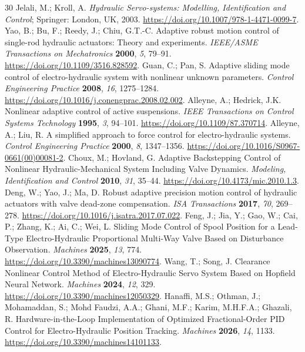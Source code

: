 \documentclass[machines,article,submit,pdftex,moreauthors]{Definitions/mdpi}
\begin{document}
\begin{thebibliography}{30}
 Jelali, M.; Kroll, A. \emph{Hydraulic Servo-systems: Modelling, Identification and Control}; Springer: London, UK, 2003. \url{https://doi.org/10.1007/978-1-4471-0099-7}.
 Yao, B.; Bu, F.; Reedy, J.; Chiu, G.T.-C. Adaptive robust motion control of single-rod hydraulic actuators: Theory and experiments. \emph{IEEE/ASME Transactions on Mechatronics} \textbf{2000}, \emph{5}, 79--91. \url{https://doi.org/10.1109/3516.828592}.
 Guan, C.; Pan, S. Adaptive sliding mode control of electro-hydraulic system with nonlinear unknown parameters. \emph{Control Engineering Practice} \textbf{2008}, \emph{16}, 1275--1284. \url{https://doi.org/10.1016/j.conengprac.2008.02.002}.
 Alleyne, A.; Hedrick, J.K. Nonlinear adaptive control of active suspensions. \emph{IEEE Transactions on Control Systems Technology} \textbf{1995}, \emph{3}, 94--101. \url{https://doi.org/10.1109/87.370714}.
 Alleyne, A.; Liu, R. A simplified approach to force control for electro-hydraulic systems. \emph{Control Engineering Practice} \textbf{2000}, \emph{8}, 1347--1356. \url{https://doi.org/10.1016/S0967-0661(00)00081-2}.
 Choux, M.; Hovland, G. Adaptive Backstepping Control of Nonlinear Hydraulic-Mechanical System Including Valve Dynamics. \emph{Modeling, Identification and Control} \textbf{2010}, \emph{31}, 35--44. \url{https://doi.org/10.4173/mic.2010.1.3}.
 Deng, W.; Yao, J.; Ma, D. Robust adaptive precision motion control of hydraulic actuators with valve dead-zone compensation. \emph{ISA Transactions} \textbf{2017}, \emph{70}, 269--278. \url{https://doi.org/10.1016/j.isatra.2017.07.022}.
 Feng, J.; Jia, Y.; Gao, W.; Cai, P.; Zhang, K.; Ai, C.; Wei, L. Sliding Mode Control of Spool Position for a Lead-Type Electro-Hydraulic Proportional Multi-Way Valve Based on Disturbance Observation. \emph{Machines} \textbf{2025}, \emph{13}, 774. \url{https://doi.org/10.3390/machines13090774}.
 Wang, T.; Song, J. Clearance Nonlinear Control Method of Electro-Hydraulic Servo System Based on Hopfield Neural Network. \emph{Machines} \textbf{2024}, \emph{12}, 329. \url{https://doi.org/10.3390/machines12050329}.
 Hanaffi, M.S.; Othman, J.; Mohamaddan, S.; Mohd Faudzi, A.A.; Ghani, M.F.; Karim, M.H.F.A.; Ghazali, R. Hardware-in-the-Loop Implementation of Optimized Fractional-Order PID Control for Electro-Hydraulic Position Tracking. \emph{Machines} \textbf{2026}, \emph{14}, 1133. \url{https://doi.org/10.3390/machines14101133}.

\end{thebibliography}
\end{document}
